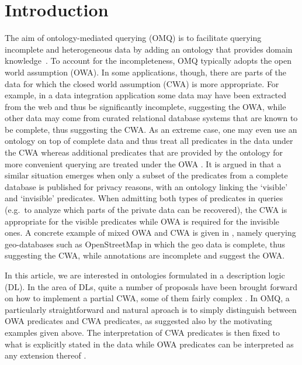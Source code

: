 \documentclass{lmcs}
\theoremstyle{definition}
\begin{document}
\section{Introduction}

The aim of ontology-mediated querying (OMQ) is to facilitate querying
incomplete and heterogeneous data by adding an ontology that provides
domain knowledge~\cite{DBLP:journals/jods/PoggiLCGLR08,DBLP:conf/rweb/BienvenuO15,DBLP:conf/ijcai/XiaoCKLPRZ18}. 
To account for the incompleteness, OMQ typically
adopts the open world assumption (OWA). In some applications, though,
there are parts of the data for which the closed world assumption
(CWA) is more appropriate.  For example, in a data integration
application some data may have been extracted from the web and thus be
significantly incomplete, suggesting the OWA, while other data may
come from curated relational database systems that are known to be
complete, thus suggesting the CWA. As an extreme case, one may even
use an ontology on top of complete data and thus treat all predicates
in the data under the CWA whereas additional predicates that are
provided by the ontology for more convenient querying are treated
under the OWA \cite{seylan09effective}. It is argued in
\cite{DBLP:conf/lics/BenediktBCP16} that a similar situation emerges
when only a subset of the predicates from a complete database is
published for privacy reasons, with an ontology linking the `visible'
and `invisible' predicates. When admitting both types of predicates in
queries (e.g.\ to analyze which parts of the private data can be
recovered), the CWA is appropriate for the visible predicates while
OWA is required for the invisible ones. A concrete example of mixed
OWA and CWA is given in \cite{Lutz:2013:ODA:2540128.2540276}, namely
querying geo-databases such as OpenStreetMap in which the geo data is
complete, thus suggesting the CWA, while annotations are incomplete
and suggest the OWA.

In this article, we are interested in ontologies formulated in a
description logic (DL).  In the area of DLs, quite a number of
proposals have been brought forward on how to implement a partial CWA,
some of them fairly complex
\cite{calvanese07eql,DBLP:journals/tocl/DoniniNR02,DBLP:conf/owled/GrimmM05,DBLP:journals/jacm/MotikR10,DBLP:conf/semweb/SenguptaKH11}.
In OMQ, a particularly straightforward and natural aproach is to simply
distinguish between OWA predicates and CWA predicates, as suggested
also by the motivating examples given above. The interpretation of CWA
predicates is then fixed to what is explicitly stated in the data
while OWA predicates can be interpreted as any extension thereof
\cite{Lutz:2013:ODA:2540128.2540276}. 
\end{document}
